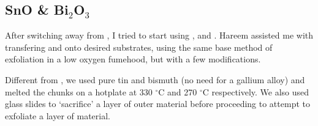 \documentclass[../Matt_Gebert_Honours_Thesis.tex]{subfiles}
\begin{document}
	\subsection{SnO \& Bi$_2$O$_3$}
	After switching away from \aluminimumoxide{}, I tried to start using \tinoxide{}, \bismuthoxide{} and \galliumoxide{}. Hareem assisted me with transfering \bismuthoxide{} and \tinoxide{} onto desired substrates, using the same base method of exfoliation in a low oxygen fumehood, but with a few modifications. 
	
	Different from \aluminimumoxide{}, we used pure tin and bismuth (no need for a gallium alloy) and melted the chunks on a hotplate at 330 $^\circ$C and 270 $^\circ$C  respectively. We also used glass slides to `sacrifice' a layer of outer material before proceeding to attempt to exfoliate a layer of material.
	
\end{document}

